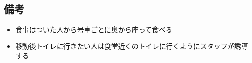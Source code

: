 \subsection{備考}
\begin{itemize}
  \item 食事はついた人から号車ごとに奥から座って食べる
  \item 移動後トイレに行きたい人は食堂近くのトイレに行くようにスタッフが誘導する
\end{itemize}




%
